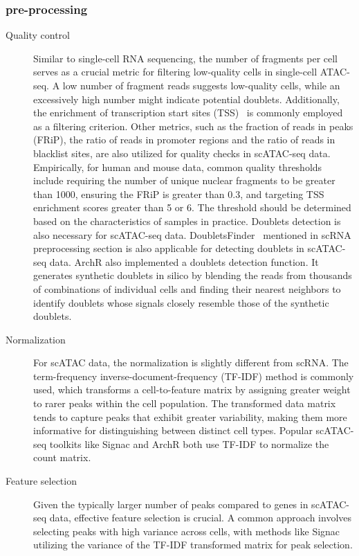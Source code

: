 \subsubsection{pre-processing}
\begin{description}
	\item[Quality control] 
	Similar to single-cell RNA sequencing, the number of fragments per cell serves as a crucial metric for filtering low-quality cells in single-cell ATAC-seq. A low number of fragment reads suggests low-quality cells, while an excessively high number might indicate potential doublets. Additionally, the enrichment of transcription start sites (TSS)~\citep{Granja2021} is commonly employed as a filtering criterion. Other metrics, such as the fraction of reads in peaks (FRiP), the ratio of reads in promoter regions and the ratio of reads in blacklist sites, are also utilized for quality checks in scATAC-seq data. Empirically, for human and mouse data, common quality thresholds include requiring the number of unique nuclear fragments to be greater than 1000, ensuring the FRiP is greater than 0.3, and targeting TSS enrichment scores greater than 5 or 6. The threshold should be determined based on the characteristics of samples in practice. Doublets detection is also necessary for scATAC-seq data. DoubletsFinder~\citep{mcginnis2019doubletfinder} mentioned in scRNA preprocessing section is also applicable for detecting doublets in scATAC-seq data. ArchR\citep{Granja2021} also implemented a doublets detection function. It generates synthetic doublets in silico by blending the reads from thousands of combinations of individual cells and finding their nearest neighbors to identify doublets whose signals closely resemble those of the synthetic doublets.
	
	\item[Normalization] 
	For scATAC data, the normalization is slightly different from scRNA. The term-frequency inverse-document-frequency (TF-IDF) method is commonly used, which transforms a cell-to-feature matrix by assigning greater weight to rarer peaks within the cell population. The transformed data matrix tends to capture peaks that exhibit greater variability, making them more informative for distinguishing between distinct cell types. Popular scATAC-seq toolkits like Signac\citep{signac} and ArchR\citep{granja2019single} both use TF-IDF to normalize the count matrix.
	
	\item[Feature selection] 
	Given the typically larger number of peaks compared to genes in scATAC-seq data, effective feature selection is crucial. A common approach involves selecting peaks with high variance across cells, with methods like Signac\citep{signac} utilizing the variance of the TF-IDF transformed matrix for peak selection.
\end{description}

